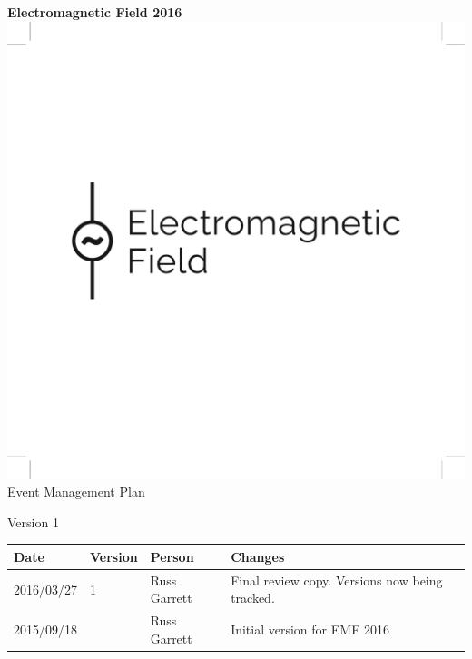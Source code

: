 

\newcommand{\st}{\superscript{st} }
\newcommand{\nd}{\superscript{nd} }
\renewcommand{\th}{\superscript{th} }




\begin{titlepage}
\thispagestyle{empty}
\begin{center}
{\bf \LARGE Electromagnetic Field 2016}\\[36pt]
\includegraphics{emf-logo.pdf}\\[48pt]
{\Large Event Management Plan}

Version 1

\vfill

\begin{tabular}{l | l | l | p{10cm}}
  Date & Version & Person & Changes \\
  \hline
  2016/03/27 & 1 & Russ Garrett & Final review copy. Versions now being tracked. \\
  \hline
  2015/09/18 &  & Russ Garrett & Initial version for EMF 2016 \\
\end{tabular}

\end{center}
\end{titlepage}

\tableofcontents

\newpage



